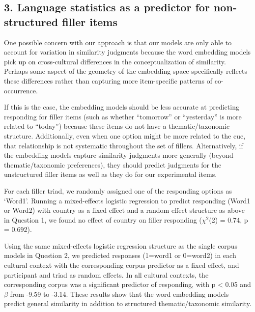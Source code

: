 \documentclass[10pt, letterpaper]{article}
\begin{document}
\hypertarget{language-statistics-as-a-predictor-for-non-structured-filler-items}{%
\subsection{3. Language statistics as a predictor for non-structured
filler
items}\label{language-statistics-as-a-predictor-for-non-structured-filler-items}}

One possible concern with our approach is that our models are only able
to account for variation in similarity judgments because the word
embedding models pick up on cross-cultural differences in the
conceptualization of similarity. Perhaps some aspect of the geometry of
the embedding space specifically reflects these differences rather than
capturing more item-specific patterns of co-occurrence.

If this is the case, the embedding models should be less accurate at
predicting responding for filler items (such as whether ``tomorrow'' or
``yesterday'' is more related to ``today'') because these items do not
have a thematic/taxonomic structure. Additionally, even when one option
might be more related to the cue, that relationship is not systematic
throughout the set of fillers. Alternatively, if the embedding models
capture similarity judgments more generally (beyond thematic/taxonomic
preferences), they should predict judgments for the unstructured filler
items as well as they do for our experimental items.

For each filler triad, we randomly assigned one of the responding
options as `Word1'. Running a mixed-effects logistic regression to
predict responding (Word1 or Word2) with country as a fixed effect and a
random effect structure as above in Question 1, we found no effect of
country on filler responding (\(\chi^2\)(2) = 0.74, p = 0.692).

Using the same mixed-effects logistic regression structure as the single
corpus models in Question 2, we predicted responses (1=word1 or 0=word2)
in each cultural context with the corresponding corpus predictor as a
fixed effect, and participant and triad as random effects. In all
cultural contexts, the corresponding corpus was a significant predictor
of responding, with p \textless{} 0.05 and \(\beta\) from -9.59 to
-3.14. These results show that the word embedding models predict general
similarity in addition to structured thematic/taxonomic similarity.
\end{document}
